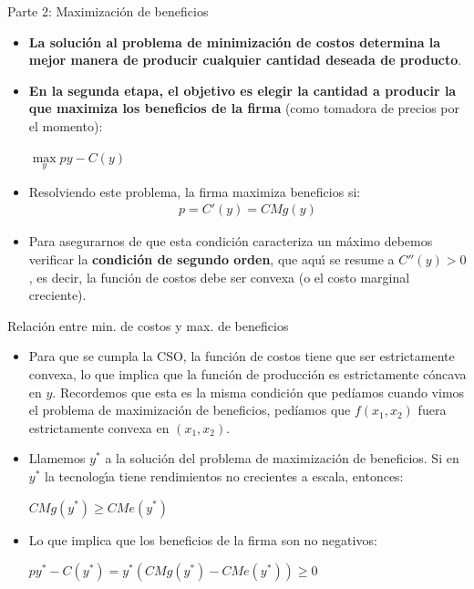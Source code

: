 \documentclass{beamer}
\theoremstyle{definition}
\begin{document}
\begin{frame}{Parte 2: Maximización de beneficios}
\begin{itemize}
\item \textbf{La soluci\'{o}n al problema de minimizaci\'{o}n de costos determina la mejor
manera de producir cualquier cantidad deseada de producto}.
\item \textbf{En la segunda etapa, el objetivo es elegir la cantidad a producir la que maximiza los
beneficios de la firma} (como tomadora de precios por el momento):
\begin{center}
$\max\limits_{y}py-C(y)$
\end{center}
\item Resolviendo este problema, la firma maximiza beneficios si:
\begin{align}
p=C'(y)=CMg(y) \label{eqmaxpi}
\end{align}
\item Para asegurarnos de que esta condici\'{o}n caracteriza un m\'{a}ximo debemos
verificar la \textbf{condici\'{o}n de segundo orden}, que aqu\'{\i} se resume a $C''(y)>0$, es decir, la funci\'{o}n de costos debe ser convexa (o el costo marginal creciente).
\end{itemize}
\end{frame}

\begin{frame}{Relaci\'on entre min. de costos y max. de beneficios}
\begin{itemize}
\item Para que se cumpla la CSO, la funci\'{o}n de costos tiene que ser estrictamente convexa, lo que implica que la funci\'{o}n de producci\'{o}n es estrictamente c\'{o}ncava en $y$. Recordemos que esta es la misma condición que pedíamos cuando vimos el problema de maximización de beneficios, pedíamos que $f(x_1,x_2)$ fuera estrictamente convexa en $(x_1,x_2)$.
\item Llamemos $y^{\ast}$ a la soluci\'{o}n del problema de maximizaci\'{o}n de
beneficios. Si en $y^{\ast}$ la tecnolog\'{\i}a tiene rendimientos no crecientes a escala, entonces:
\begin{center}
$CMg(y^{\ast })\geq CMe(y^{\ast })$
\end{center}
\item Lo que implica que los beneficios de la firma son no negativos:
\begin{center}
$py^{\ast }-C(y^{\ast })=y^{\ast}(CMg(y^{\ast })-CMe(y^{\ast }))\geq 0$
\end{center}
\end{itemize}
\end{frame}
\end{document}
